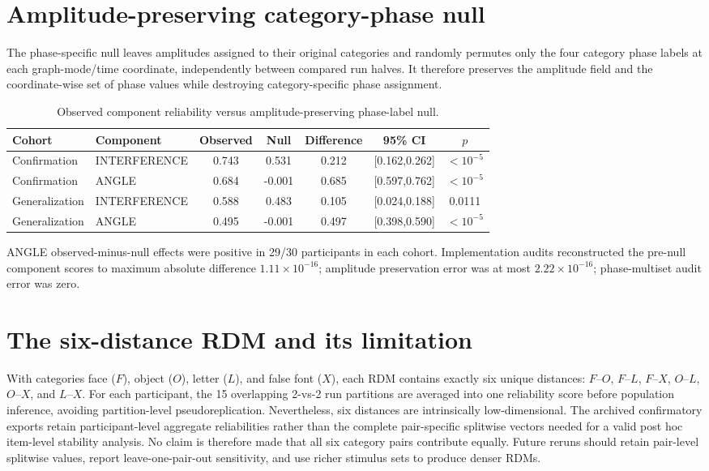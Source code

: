 \documentclass[11pt]{article}
\begin{document}
\section{Amplitude-preserving category-phase null}
The phase-specific null leaves amplitudes assigned to their original categories and randomly permutes only the four category phase labels at each graph-mode/time coordinate, independently between compared run halves. It therefore preserves the amplitude field and the coordinate-wise set of phase values while destroying category-specific phase assignment.

\begin{table}[h]
\centering\small
\caption{Observed component reliability versus amplitude-preserving phase-label null.}
\begin{tabular}{llccccc}
\toprule
Cohort & Component & Observed & Null & Difference & 95\% CI & $p$\\
\midrule
Confirmation & INTERFERENCE & 0.743 & 0.531 & 0.212 & [0.162,0.262] & $<10^{-5}$\\
Confirmation & ANGLE & 0.684 & -0.001 & 0.685 & [0.597,0.762] & $<10^{-5}$\\
Generalization & INTERFERENCE & 0.588 & 0.483 & 0.105 & [0.024,0.188] & 0.0111\\
Generalization & ANGLE & 0.495 & -0.001 & 0.497 & [0.398,0.590] & $<10^{-5}$\\
\bottomrule
\end{tabular}
\end{table}
ANGLE observed-minus-null effects were positive in 29/30 participants in each cohort. Implementation audits reconstructed the pre-null component scores to maximum absolute difference $1.11\times10^{-16}$; amplitude preservation error was at most $2.22\times10^{-16}$; phase-multiset audit error was zero.

\section{The six-distance RDM and its limitation}
With categories face ($F$), object ($O$), letter ($L$), and false font ($X$), each RDM contains exactly six unique distances: $F$--$O$, $F$--$L$, $F$--$X$, $O$--$L$, $O$--$X$, and $L$--$X$. For each participant, the 15 overlapping 2-vs-2 run partitions are averaged into one reliability score before population inference, avoiding partition-level pseudoreplication. Nevertheless, six distances are intrinsically low-dimensional. The archived confirmatory exports retain participant-level aggregate reliabilities rather than the complete pair-specific splitwise vectors needed for a valid post hoc item-level stability analysis. No claim is therefore made that all six category pairs contribute equally. Future reruns should retain pair-level splitwise values, report leave-one-pair-out sensitivity, and use richer stimulus sets to produce denser RDMs.
\end{document}
